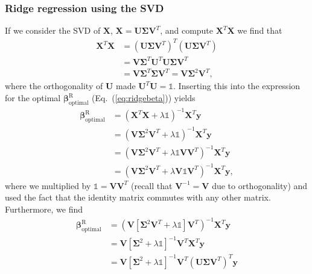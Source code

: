 \documentclass[a4paper]{article}
\newcommand{\eq} [1]{Eq.\ (\ref{eq:#1})}
\begin{document}
\begin{multicols}{2}
\subsubsection{Ridge regression using the SVD}
If we consider the SVD of $\mathbf{X}$, $\mathbf{X}=\mathbf{U}\bm\Sigma \mathbf{V}^T$, and compute $\mathbf{X}^T\mathbf{X}$ we find that 
\begin{align}
\mathbf{X}^T\mathbf{X} &= \left(\mathbf{U}\bm\Sigma \mathbf{V}^T\right)^T \left(\mathbf{U}\bm\Sigma \mathbf{V}^T\right) \nonumber \\
%
&= \mathbf{V}\bm\Sigma^T \mathbf{U}^T \mathbf{U}\bm\Sigma \mathbf{V}^T \nonumber \\
%
&= \mathbf{V}\bm\Sigma^T \bm\Sigma \mathbf{V}^T = \mathbf{V}\bm\Sigma^2\mathbf{V}^T,
\end{align}
where the orthogonality of $\mathbf{U}$ made $\mathbf{U}^T\mathbf{U}=\mathds{1}$. Inserting this into the expression for the optimal $\bm\beta_\text{optimal}^\text{R}$ (\eq{ridgebeta}) yields\autocite{trevor2009elements}
\begin{align}
\bm\beta^\text{R}_\text{optimal} &= \left(\mathbf{X}^T\mathbf{X}+\lambda\mathds{1}\right)^{-1}\mathbf{X}^T\mathbf{y} \nonumber \\
%
&= \left(\mathbf{V}\bm\Sigma^2\mathbf{V}^T +\lambda\mathds{1}\right)^{-1}\mathbf{X}^T\mathbf{y} \nonumber \\
%
&= \left(\mathbf{V}\bm\Sigma^2\mathbf{V}^T +\lambda\mathds{1}\mathbf{V}\mathbf{V}^T\right)^{-1}\mathbf{X}^T\mathbf{y} \nonumber \\
%
&= \left(\mathbf{V}\bm\Sigma^2\mathbf{V}^T +\lambda\mathbf{V}\mathds{1}\mathbf{V}^T\right)^{-1}\mathbf{X}^T\mathbf{y}, \nonumber
\end{align}
where we multiplied by $\mathds{1}=\mathbf{V}\mathbf{V}^T$ (recall that $\mathbf{V}^{-1}=\mathbf{V}$ due to orthogonality) and used the fact that the identity matrix commutes with any other matrix. Furthermore, we find
\begin{align}
\bm\beta^\text{R}_\text{optimal}&= \left(\mathbf{V}\left[\bm\Sigma^2\mathbf{V}^T +\lambda\mathds{1}\right]\mathbf{V}^T\right)^{-1}\mathbf{X}^T\mathbf{y} \nonumber \\
%
&= \mathbf{V}\left[\bm\Sigma^2 +\lambda\mathds{1}\right]^{-1}\mathbf{V}^T\mathbf{X}^T\mathbf{y} \nonumber \\
%
&= \mathbf{V}\left[\bm\Sigma^2 +\lambda\mathds{1}\right]^{-1}\mathbf{V}^T\left(\mathbf{U}\bm\Sigma \mathbf{V}^T\right)^T\mathbf{y} \nonumber \\

\end{align}
\end{multicols}
\end{document}
